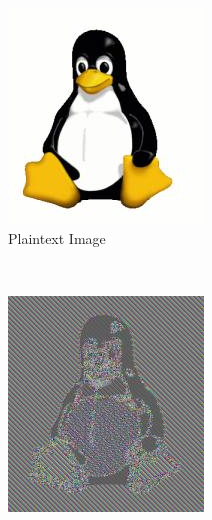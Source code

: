 \begin{figure}[h!]
        \centering
        \begin{subfigure}[c]{0.27\textwidth}
                \centering
                \includegraphics[width=\textwidth]{images/Tux.jpg}
                \caption{Plaintext Image}
                \label{fig:ECB_Exemple_plaintext}
        \end{subfigure}
        ~
        \begin{subfigure}[c]{0.27\textwidth}
                \centering
                \includegraphics[width=\textwidth]{images/Tux_ecb.jpg}

\end{subfigure}
\end{figure}
